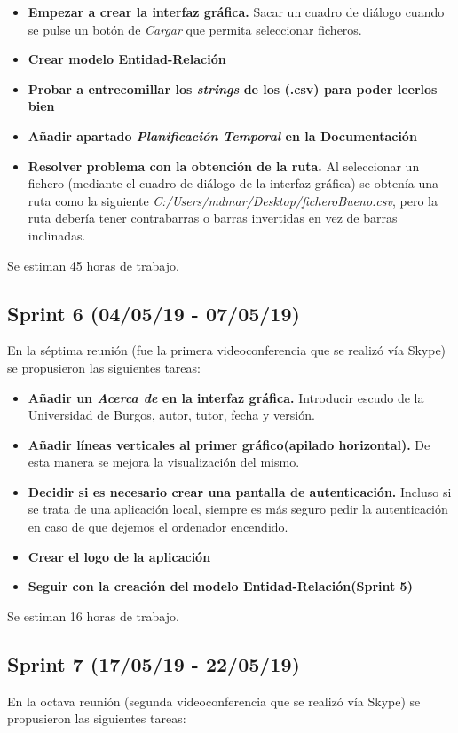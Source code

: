 \begin{itemize}
\item
\textbf{Empezar a crear la interfaz gráfica.} Sacar un cuadro de diálogo cuando se pulse un botón de \emph{Cargar} que permita seleccionar ficheros.
\item
\textbf{Crear modelo Entidad-Relación}
\item
\textbf{Probar a entrecomillar los \emph{strings} de los (.csv) para poder leerlos bien}
\item
\textbf{Añadir apartado \emph{Planificación Temporal} en la Documentación}
\item
\textbf{Resolver problema con la obtención de la ruta.} Al seleccionar un fichero (mediante el cuadro de diálogo de la interfaz gráfica) se obtenía una ruta como la siguiente \emph{C:/Users/mdmar/Desktop/ficheroBueno.csv}, pero la ruta debería tener contrabarras o barras invertidas en vez de barras inclinadas.
\end{itemize}

Se estiman 45 horas de trabajo.

\subsection{Sprint 6 (04/05/19 - 07/05/19)}
En la séptima reunión (fue la primera videoconferencia que se realizó vía Skype) se propusieron las siguientes tareas:

\begin{itemize}
\item
\textbf{Añadir un \emph{Acerca de} en la interfaz gráfica.} Introducir escudo de la Universidad de Burgos, autor, tutor, fecha y versión.
\item
\textbf{Añadir líneas verticales al primer gráfico(apilado horizontal).} De esta manera se mejora la visualización del mismo.
\item
\textbf{Decidir si es necesario crear una pantalla de autenticación.} Incluso si se trata de una aplicación local, siempre es más seguro pedir la autenticación en caso de que dejemos el ordenador encendido.
\item
\textbf{Crear el logo de la aplicación} 
\item
\textbf{Seguir con la creación del modelo Entidad-Relación(Sprint 5)}
\end{itemize}

Se estiman 16 horas de trabajo.

\subsection{Sprint 7 (17/05/19 - 22/05/19)}
En la octava reunión (segunda videoconferencia que se realizó vía Skype) se propusieron las siguientes tareas:

